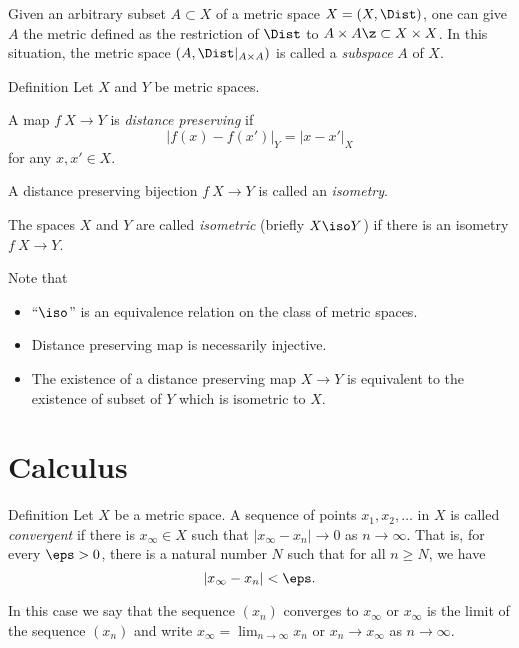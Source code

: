 Given an arbitrary subset $A\subset X$ of a metric space $X=(X,\Dist)$,
one can give $A$ the metric defined as the restriction of $\Dist$ to $A\times A\z\subset X\times X$. 
In this situation, the metric space $(A,\Dist|_{A\times A})$ is called a \emph{subspace} $A$ of $X$.

\begin{thm}{Definition}
Let $X$ and $Y$ be metric spaces.
\begin{subthm}{}
A map $f\:X\to Y$ is \emph{distance preserving} if
$$|f(x)-f(x')|_Y=|x-x'|_X$$
for any $x,x'\in X$.
\end{subthm}

\begin{subthm}{}
A distance preserving bijection $f\:X\to Y$ is called an \emph{isometry}.
\end{subthm}

\begin{subthm}{}
The spaces $X$ and $Y$ are called \emph{isometric} (briefly $X\iso Y$)
 if there is an isometry  $f\:X\to Y$.
\end{subthm}

\end{thm}

Note that 
\begin{itemize}
\item ``$\iso$'' is an equivalence relation on the class of metric spaces.
\item Distance preserving map is necessarily injective.
\item The existence of a distance preserving map $X\to Y$ is equivalent to the existence of subset of $Y$ which is isometric to $X$.
\end{itemize}

\section{Calculus}

\begin{thm}{Definition}
 Let $X$ be a metric space.
A sequence of points $x_1, x_2, \ldots$ in $X$ is called \emph{convergent}
if there is 
$x_\infty\in X$ such that $|x_\infty -x_n|\to 0$ as $n\to\infty$.  
That is, for every $\eps > 0$, there is a natural number $N$ such that for all $n \geq N$, we have $$|x_\infty-x_n| < \eps.$$

In this case we say that the sequence $(x_n)$ converges to $x_\infty$ 
or $x_\infty$ is the limit of the sequence $(x_n)$
and write 
$x_\infty=\lim_{n\to\infty} x_n$
or $x_n\to x_\infty$ as $n\to\infty$.
\end{thm}

